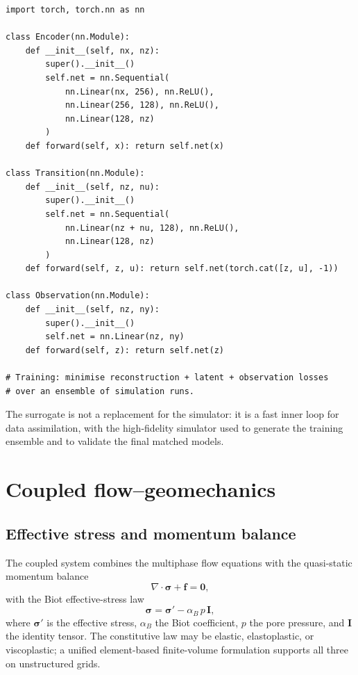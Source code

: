 \documentclass[10pt,a4paper]{article}
\newcommand{\divv}{\nabla\cdot}
\begin{document}
\begin{lstlisting}[caption={E2CO-style surrogate training skeleton.}]
import torch, torch.nn as nn

class Encoder(nn.Module):
    def __init__(self, nx, nz):
        super().__init__()
        self.net = nn.Sequential(
            nn.Linear(nx, 256), nn.ReLU(),
            nn.Linear(256, 128), nn.ReLU(),
            nn.Linear(128, nz)
        )
    def forward(self, x): return self.net(x)

class Transition(nn.Module):
    def __init__(self, nz, nu):
        super().__init__()
        self.net = nn.Sequential(
            nn.Linear(nz + nu, 128), nn.ReLU(),
            nn.Linear(128, nz)
        )
    def forward(self, z, u): return self.net(torch.cat([z, u], -1))

class Observation(nn.Module):
    def __init__(self, nz, ny):
        super().__init__()
        self.net = nn.Linear(nz, ny)
    def forward(self, z): return self.net(z)

# Training: minimise reconstruction + latent + observation losses
# over an ensemble of simulation runs.
\end{lstlisting}

The surrogate is not a replacement for the simulator: it is a fast inner loop
for data assimilation, with the high-fidelity simulator used to generate the
training ensemble and to validate the final matched models.

\section{Coupled flow--geomechanics}

\subsection{Effective stress and momentum balance}

The coupled system combines the multiphase flow equations with the
quasi-static momentum balance
\begin{equation}
  \divv\bm{\sigma} + \bm{f} = \bm{0},
  \label{eq:momentum}
\end{equation}
with the Biot effective-stress law
\begin{equation}
  \bm{\sigma} = \bm{\sigma}' - \alpha_B\,p\,\bm{I},
  \label{eq:biot}
\end{equation}
where $\bm{\sigma}'$ is the effective stress, $\alpha_B$ the Biot coefficient,
$p$ the pore pressure, and $\bm{I}$ the identity tensor. The constitutive law
may be elastic, elastoplastic, or viscoplastic; a unified element-based
finite-volume formulation supports all three on unstructured grids.
\end{document}
